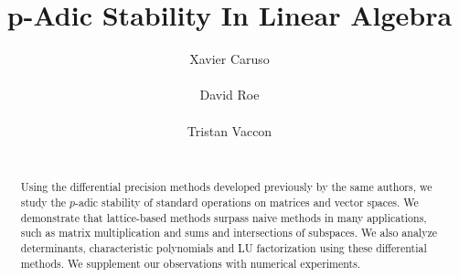 \documentclass{sig-alternate-2013}
\begin{document}
\newtheorem{theo}{Theorem}[section]
\newtheorem{lem}[theo]{Lemma}
\newtheorem{prop}[theo]{Proposition}
\newtheorem{cor}[theo]{Corollary}
\newtheorem{quest}[theo]{Question}
\newtheorem{conj}[theo]{Conjecture}
\theoremstyle{definition}
\newtheorem{rem}[theo]{Remark}
\newtheorem{ex}[theo]{Example}
\newtheorem{deftn}[theo]{Definition}

\title{p-Adic Stability In Linear Algebra}

\author{
\alignauthor Xavier Caruso\\
  \\
\alignauthor David Roe \\
  \\
\alignauthor Tristan Vaccon\\
  \\
}

\maketitle

\begin{abstract}
Using the differential precision methods developed previously by the same authors,
we study the $p$-adic stability of standard operations on matrices and vector 
spaces. We demonstrate that lattice-based methods surpass naive methods in many
applications, such as matrix multiplication and sums and intersections of subspaces.
We also analyze determinants, characteristic polynomials and LU factorization using these differential methods.
We supplement our observations with numerical experiments.
\end{abstract}


%
%
\end{document}

